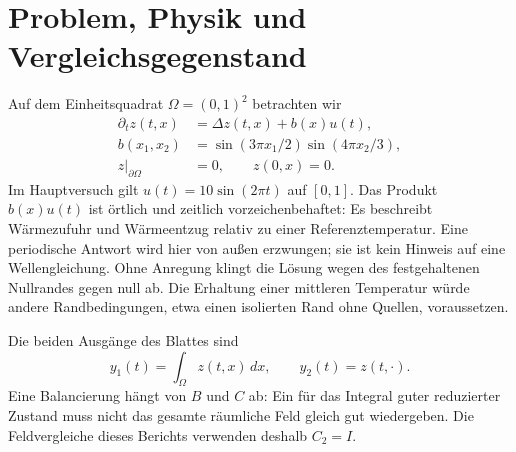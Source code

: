 \section{Problem, Physik und Vergleichsgegenstand}
Auf dem Einheitsquadrat $\Omega=(0,1)^2$ betrachten wir
\begin{align}
 \partial_t z(t,x)&=\Delta z(t,x)+b(x)u(t),\\
 b(x_1,x_2)&=\sin(3\pi x_1/2)\sin(4\pi x_2/3),\\
 z|_{\partial\Omega}&=0,\qquad z(0,x)=0.
\end{align}
Im Hauptversuch gilt $u(t)=10\sin(2\pi t)$ auf $[0,1]$. Das Produkt $b(x)u(t)$ ist örtlich und zeitlich vorzeichenbehaftet: Es beschreibt Wärmezufuhr und Wärmeentzug relativ zu einer Referenztemperatur. Eine periodische Antwort wird hier von außen erzwungen; sie ist kein Hinweis auf eine Wellengleichung. Ohne Anregung klingt die Lösung wegen des festgehaltenen Nullrandes gegen null ab. Die Erhaltung einer mittleren Temperatur würde andere Randbedingungen, etwa einen isolierten Rand ohne Quellen, voraussetzen.

Die beiden Ausgänge des Blattes sind
\begin{equation}
 y_1(t)=\int_\Omega z(t,x)\,dx,\qquad y_2(t)=z(t,\cdot).
\end{equation}
Eine Balancierung hängt von $B$ und $C$ ab: Ein für das Integral guter reduzierter Zustand muss nicht das gesamte räumliche Feld gleich gut wiedergeben. Die Feldvergleiche dieses Berichts verwenden deshalb $C_2=I$.

